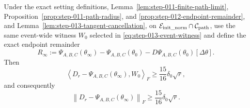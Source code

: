 \begin{proposition}
\label{prop:step-013-preserved-raw-margin}
Under the exact setting definitions,
Lemma~\ref{lem:step-011-finite-path-limit},
Proposition~\ref{prop:step-011-path-radius}, and
\ref{prop:step-012-endpoint-remainder}, and
Lemma~\ref{lem:step-013-tangent-cancellation}, on
\(\mathcal E_{\rm init\_norm}\cap\mathcal C_{\rm path}\), use the same
event-wide witness \(W_0\) selected in
\eqref{eq:step-013-event-witness} and define the exact
endpoint remainder
\begin{equation}
  R_\infty:=\Psi_{A,B,C}(\theta_\infty)-\Psi_{A,B,C}(\theta_0)
  -D\Psi_{A,B,C}(\theta_0)[\Delta\theta].                \label{eq:step-013-7}
\end{equation}
Then
\begin{equation}
  \left\langle D_r-\Psi_{A,B,C}(\theta_\infty),W_0\right\rangle_F
  \ge\frac{15}{16}\delta_0\sqrt r,                      \label{eq:step-013-8}
\end{equation}
and consequently
\begin{equation}
  \left\|D_r-\Psi_{A,B,C}(\theta_\infty)\right\|_F
  \ge\frac{15}{16}\delta_0\sqrt r.                      \label{eq:step-013-9}
\end{equation}

\end{proposition}


